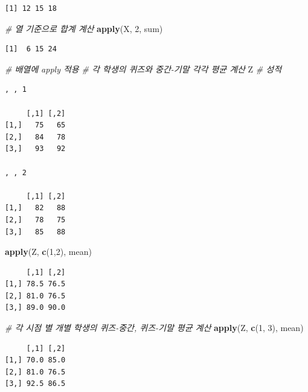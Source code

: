 \documentclass[
  11pt,
]{krantz}
\newenvironment{Shaded}{\begin{snugshade}}{\end{snugshade}}
\newcommand{\CommentTok}[1]{\textcolor[rgb]{0.37,0.37,0.37}{\textit{#1}}}
\newcommand{\DecValTok}[1]{\textcolor[rgb]{0.06,0.06,0.06}{#1}}
\newcommand{\KeywordTok}[1]{\textcolor[rgb]{0.27,0.27,0.27}{\textbf{#1}}}
\newcommand{\NormalTok}[1]{#1}
\begin{document}
\begin{verbatim}
[1] 12 15 18
\end{verbatim}

\begin{Shaded}
\begin{Highlighting}[]
\CommentTok{# 열 기준으로 합계 계산}
\KeywordTok{apply}\NormalTok{(X, }\DecValTok{2}\NormalTok{, sum)}
\end{Highlighting}
\end{Shaded}

\begin{verbatim}
[1]  6 15 24
\end{verbatim}

\begin{Shaded}
\begin{Highlighting}[]
\CommentTok{# 배열에 apply 적용}
\CommentTok{# 각 학생의 퀴즈와 중간-기말 각각 평균 계산}
\NormalTok{Z }\CommentTok{# 성적}
\end{Highlighting}
\end{Shaded}

\begin{verbatim}
, , 1

     [,1] [,2]
[1,]   75   65
[2,]   84   78
[3,]   93   92

, , 2

     [,1] [,2]
[1,]   82   88
[2,]   78   75
[3,]   85   88
\end{verbatim}

\begin{Shaded}
\begin{Highlighting}[]
\KeywordTok{apply}\NormalTok{(Z, }\KeywordTok{c}\NormalTok{(}\DecValTok{1}\NormalTok{,}\DecValTok{2}\NormalTok{), mean)}
\end{Highlighting}
\end{Shaded}

\begin{verbatim}
     [,1] [,2]
[1,] 78.5 76.5
[2,] 81.0 76.5
[3,] 89.0 90.0
\end{verbatim}

\begin{Shaded}
\begin{Highlighting}[]
\CommentTok{# 각 시점 별 개별 학생의 퀴즈-중간, 퀴즈-기말 평균 계산}
\KeywordTok{apply}\NormalTok{(Z, }\KeywordTok{c}\NormalTok{(}\DecValTok{1}\NormalTok{, }\DecValTok{3}\NormalTok{), mean)}
\end{Highlighting}
\end{Shaded}

\begin{verbatim}
     [,1] [,2]
[1,] 70.0 85.0
[2,] 81.0 76.5
[3,] 92.5 86.5
\end{verbatim}
\end{document}
